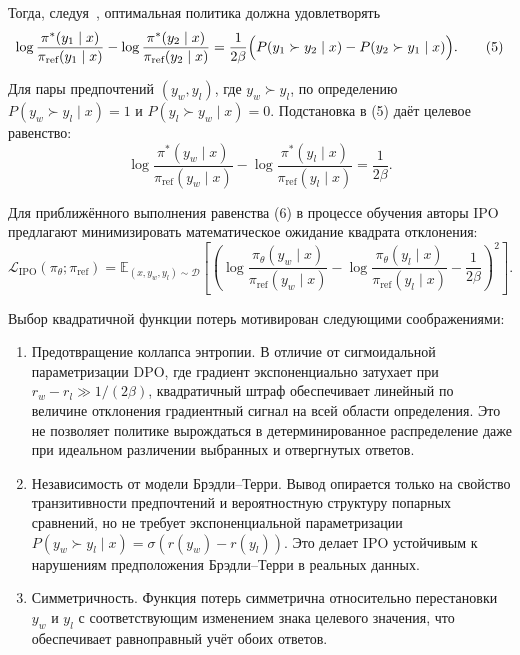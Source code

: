 \documentclass[a4paper,12pt]{article}
\begin{document}
Тогда, следуя~\cite{azar2024general}, оптимальная политика должна удовлетворять
\[
\log \frac{\pi^*(y_1 \mid x)}{\pi_{\text{ref}}(y_1 \mid x)} - \log \frac{\pi^*(y_2 \mid x)}{\pi_{\text{ref}}(y_2 \mid x)} = \frac{1}{2\beta} \Bigl( P(y_1 \succ y_2 \mid x) - P(y_2 \succ y_1 \mid x) \Bigr). \tag{5}
\]

Для пары предпочтений $(y_w, y_l)$, где $y_w \succ y_l$, по определению $P(y_w \succ y_l \mid x) = 1$ и $P(y_l \succ y_w \mid x) = 0$. Подстановка в (5) даёт целевое равенство:
\[
\log \frac{\pi^*(y_w \mid x)}{\pi_{\text{ref}}(y_w \mid x)} - \log \frac{\pi^*(y_l \mid x)}{\pi_{\text{ref}}(y_l \mid x)} = \frac{1}{2\beta}. \tag{6}
\]

Для приближённого выполнения равенства (6) в процессе обучения авторы IPO предлагают минимизировать математическое ожидание квадрата отклонения:
\[
\mathcal{L}_{\text{IPO}}(\pi_\theta; \pi_{\text{ref}}) = \mathbb{E}_{(x, y_w, y_l) \sim \mathcal{D}} \left[ \left( \log \frac{\pi_\theta(y_w \mid x)}{\pi_{\text{ref}}(y_w \mid x)} - \log \frac{\pi_\theta(y_l \mid x)}{\pi_{\text{ref}}(y_l \mid x)} - \frac{1}{2\beta} \right)^2 \right]. \tag{7}
\]

Выбор квадратичной функции потерь мотивирован следующими соображениями:

\begin{enumerate}
    \item {Предотвращение коллапса энтропии.} В отличие от сигмоидальной параметризации DPO, где градиент экспоненциально затухает при $r_w - r_l \gg 1/(2\beta)$, квадратичный штраф обеспечивает линейный по величине отклонения градиентный сигнал на всей области определения. Это не позволяет политике вырождаться в детерминированное распределение даже при идеальном различении выбранных и отвергнутых ответов.

    \item {Независимость от модели Брэдли–Терри.} Вывод опирается только на свойство транзитивности предпочтений и вероятностную структуру попарных сравнений, но не требует экспоненциальной параметризации $P(y_w \succ y_l \mid x) = \sigma(r(y_w) - r(y_l))$. Это делает IPO устойчивым к нарушениям предположения Брэдли–Терри в реальных данных.

    \item {Симметричность.} Функция потерь симметрична относительно перестановки $y_w$ и $y_l$ с соответствующим изменением знака целевого значения, что обеспечивает равноправный учёт обоих ответов.
\end{enumerate}
\end{document}
